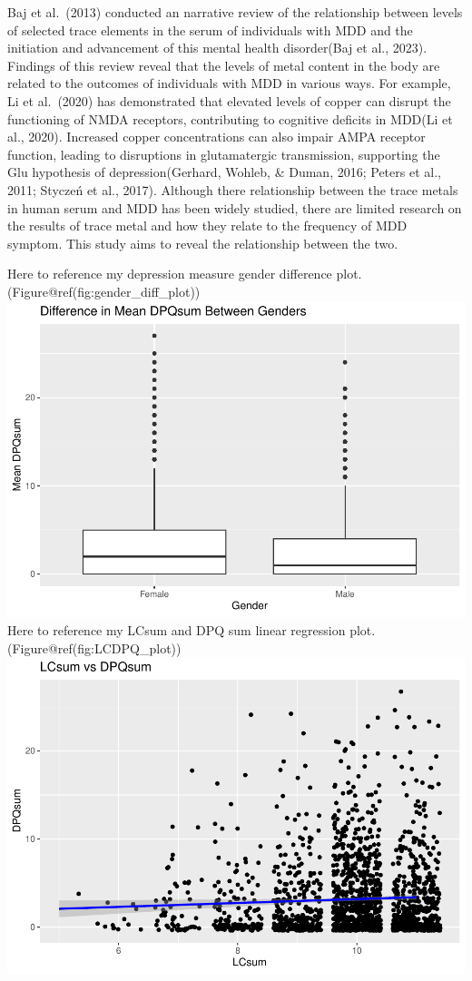 \documentclass[
  man]{apa6}
\begin{document}
Baj et al.~(2013) conducted an narrative review of the relationship between levels of selected trace elements in the serum of individuals with MDD and the initiation and advancement of this mental health disorder(Baj et al., 2023). Findings of this review reveal that the levels of metal content in the body are related to the outcomes of individuals with MDD in various ways. For example, Li et al.~(2020) has demonstrated that elevated levels of copper can disrupt the functioning of NMDA receptors, contributing to cognitive deficits in MDD(Li et al., 2020). Increased copper concentrations can also impair AMPA receptor function, leading to disruptions in glutamatergic transmission, supporting the Glu hypothesis of depression(Gerhard, Wohleb, \& Duman, 2016; Peters et al., 2011; Styczeń et al., 2017).
Although there relationship between the trace metals in human serum and MDD has been widely studied, there are limited research on the results of trace metal and how they relate to the frequency of MDD symptom. This study aims to reveal the relationship between the two.

Here to reference my depression measure gender difference plot.(Figure@ref(fig:gender\_diff\_plot))
\includegraphics{nhanes2017_files/figure-latex/gender_diff_plot-1.pdf}
Here to reference my LCsum and DPQ sum linear regression plot. (Figure@ref(fig:LCDPQ\_plot))
\includegraphics{nhanes2017_files/figure-latex/LCDPQ-plot-1.pdf}
\end{document}
